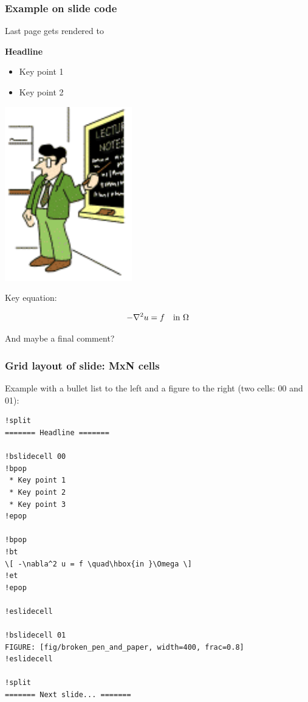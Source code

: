 \documentclass{beamer}
\begin{document}
\begin{frame}
\frametitle{Example on slide code}

Last page gets rendered to

\noindent\textbf{\Large Headline}

\begin{itemize}
 \item Key point 1

 \item Key point 2
\end{itemize}

\noindent
\begin{center}  %
  \centerline{\includegraphics[width=0.4\linewidth]{fig/teacher1.pdf}}
\end{center}


Key equation:

\[ -\nabla^2 u = f \quad\hbox{in }\Omega \]

And maybe a final comment?
\end{frame}

\begin{frame}
\frametitle{Grid layout of slide: MxN cells}

Example with a bullet list to the left and
a figure to the right (two cells: 00 and 01):

\begin{Verbatim}[numbers=none,fontsize=\fontsize{9pt}{9pt},baselinestretch=0.95]
!split
======= Headline =======

!bslidecell 00
!bpop
 * Key point 1
 * Key point 2
 * Key point 3
!epop

!bpop
!bt
\[ -\nabla^2 u = f \quad\hbox{in }\Omega \]
!et
!epop

!eslidecell

!bslidecell 01
FIGURE: [fig/broken_pen_and_paper, width=400, frac=0.8]
!eslidecell

!split
======= Next slide... =======
\end{Verbatim}
\end{frame}
\end{document}
